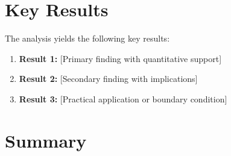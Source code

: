 
\section{Key Results}
\label{sec:eih-results}

The analysis yields the following key results:

\begin{enumerate}
    \item \textbf{Result 1:} [Primary finding with quantitative support]
    \item \textbf{Result 2:} [Secondary finding with implications]
    \item \textbf{Result 3:} [Practical application or boundary condition]
\end{enumerate}


\section{Summary}
\label{sec:eih-summary}

